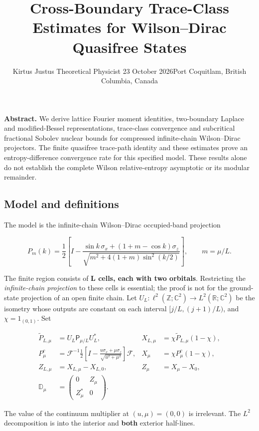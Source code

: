 \documentclass[
  10pt,
  a4paper,
]{article}
\title{Cross-Boundary Trace-Class Estimates for Wilson--Dirac Quasifree States}
\author{Kirtus Justus \textbullet{} Theoretical Physicist \textbullet{} 23 October 2026\tabularnewline Port Coquitlam, British Columbia, Canada}
\date{}
\begin{document}
\maketitle

\textbf{Abstract.} We derive lattice Fourier moment identities, two-boundary Laplace and modified-Bessel representations, trace-class convergence and subcritical fractional Sobolev nuclear bounds for compressed infinite-chain Wilson--Dirac projectors. The finite quasifree trace-path identity and these estimates prove an entropy-difference convergence rate for this specified model. These results alone do not establish the complete Wilson relative-entropy asymptotic or its modular remainder.

\subsection{Model and definitions}\label{model-and-definitions}

The model is the infinite-chain Wilson--Dirac occupied-band projection

\[
P_m(k)=\frac12\left[I-\frac{\sin k\,\sigma_x+(1+m-\cos k)\sigma_z}{\sqrt{m^2+4(1+m)\sin^2(k/2)}}\right],\qquad m=\mu/L.
\]

The finite region consists of \textbf{L cells, each with two orbitals}. Restricting the \emph{infinite-chain projection} to these cells is essential; the proof is not for the ground-state projection of an open finite chain. Let \(U_L\colon\ell^2(\mathbb Z;\mathbb C^2)\to L^2(\mathbb R;\mathbb C^2)\) be the isometry whose outputs are constant on each interval \([j/L,(j+1)/L)\), and \(\chi=1_{(0,1)}\). Set

\[
\begin{aligned}
\widetilde P_{L,\mu}&=U_L\mathsf P_{\mu/L}U_L^*,
&X_{L,\mu}&=\chi\widetilde P_{L,\mu}(1-\chi),\\
P_\mu^c&=\mathcal F^{-1}\frac12\left[I-\frac{u\sigma_x+\mu\sigma_z}{\sqrt{u^2+\mu^2}}\right]\mathcal F,
&X_\mu&=\chi P_\mu^c(1-\chi),\\
Z_{L,\mu}&=X_{L,\mu}-X_{L,0},&Z_\mu&=X_\mu-X_0,\\
\mathbb D_\mu&=\begin{pmatrix}0&Z_\mu\\Z_\mu^*&0\end{pmatrix}.
\end{aligned}
\]

The value of the continuum multiplier at \((u,\mu)=(0,0)\) is irrelevant. The \(L^2\) decomposition is into the interior and \textbf{both} exterior half-lines.
\end{document}
